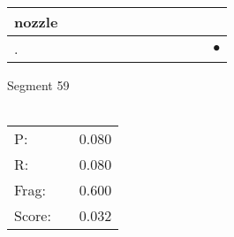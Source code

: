 \documentclass[landscape]{article}
\newcommand{\ssp}{\hspace{2pt}}
\newcommand{\mex}{\cellcolor{g}$\bullet$}
\begin{document}
\begin{tabular}{|l|p{10pt}|p{10pt}|p{10pt}|p{10pt}|p{10pt}|p{10pt}|p{10pt}|p{10pt}|p{10pt}|p{10pt}|p{10pt}|}
\hline
\ssp nozzle \ssp&\hspace{2pt}&\hspace{2pt}&\hspace{2pt}&\hspace{2pt}&\hspace{2pt}&\hspace{2pt}&\hspace{2pt}&\hspace{2pt}&\hspace{2pt}&\hspace{2pt}&\hspace{2pt}\\
\hline
\ssp \cellcolor{ref10}. \ssp&\hspace{2pt}&\hspace{2pt}&\hspace{2pt}&\hspace{2pt}&\hspace{2pt}&\hspace{2pt}&\hspace{2pt}&\hspace{2pt}&\hspace{2pt}&\hspace{2pt}&\hspace{2pt}\mex\\
\hline
\end{tabular}

\vspace{6pt}
\noindent Segment 59\\\\
\noindent\begin{tabular}{lm{12pt}r}
\hline
P:&&0.080\\
R:&&0.080\\
Frag:&&0.600\\
Score:&&0.032\\
\end{tabular}

\newpage
\end{document}
